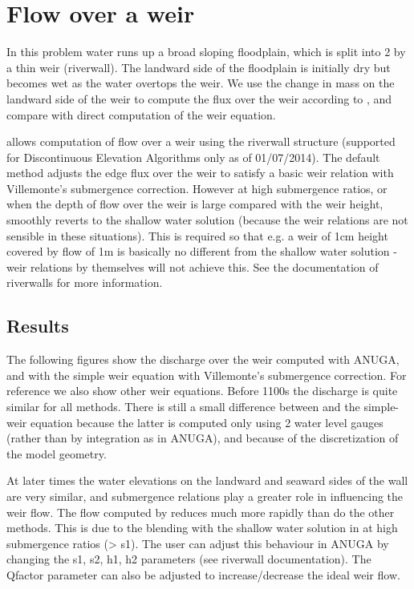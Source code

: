 
\section{Flow over a weir}

In this problem water runs up a broad sloping floodplain, which is split into 2 by a thin weir (riverwall). The landward side of the floodplain is initially dry but becomes wet as the water overtops the weir. We use the change in mass on the landward side of the weir to compute the flux over the weir according to \anuga{}, and compare with direct computation of the weir equation. 

\anuga{} allows computation of flow over a weir using the riverwall structure (supported for Discontinuous Elevation Algorithms only as of 01/07/2014). The default method adjusts the edge flux over the weir to satisfy a basic weir relation with Villemonte's submergence correction. However at high submergence ratios, or when the depth of flow over the weir is large compared with the weir height, \anuga{} smoothly reverts to the shallow water solution (because the weir relations are not sensible in these situations). This is required so that e.g. a weir of 1cm height covered by flow of 1m is basically no different from the shallow water solution - weir relations by themselves will not achieve this. See the documentation of riverwalls for more information.

\subsection{Results}

The following figures show the discharge over the weir computed with ANUGA, and with the simple weir equation with Villemonte's submergence correction. For reference we also show other weir equations. Before 1100s the discharge is quite similar for all methods. There is still a small difference between \anuga{} and the simple-weir equation because the latter is computed only using 2 water level gauges (rather than by integration as in ANUGA), and because of the discretization of the model geometry.

At later times the water elevations on the landward and seaward sides of the wall are very similar, and submergence relations play a greater role in influencing the weir flow. The flow computed by \anuga{} reduces much more rapidly than do the other methods. This is due to the blending with the shallow water solution in \anuga{} at high submergence ratios (> s1). The user can adjust this behaviour in ANUGA by changing the s1, s2, h1, h2 parameters (see riverwall documentation). The Qfactor parameter can also be adjusted to increase/decrease the ideal weir flow.

